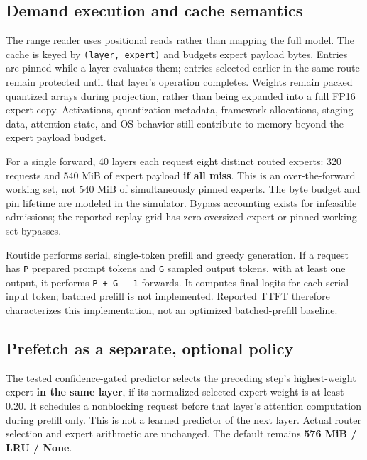 \documentclass[11pt]{article}
\begin{document}
\hypertarget{demand-execution-and-cache-semantics}{%
\subsection{Demand execution and cache semantics}\label{demand-execution-and-cache-semantics}}

The range reader uses positional reads rather than mapping the full model.
The cache is keyed by \texttt{(layer,\ expert)} and budgets expert payload bytes.
Entries are pinned while a layer evaluates them; entries selected earlier in
the same route remain protected until that layer's operation completes.
Weights remain packed quantized arrays during projection, rather than being
expanded into a full FP16 expert copy. Activations, quantization metadata,
framework allocations, staging data, attention state, and OS behavior still
contribute to memory beyond the expert payload budget.

For a single forward, 40 layers each request eight distinct routed experts:
320 requests and 540 MiB of expert payload \textbf{if all miss}. This is an
over-the-forward working set, not 540 MiB of simultaneously pinned experts.
The byte budget and pin lifetime are modeled in the simulator. Bypass
accounting exists for infeasible admissions; the reported replay grid has
zero oversized-expert or pinned-working-set bypasses.

Routide performs serial, single-token prefill and greedy generation. If a
request has \texttt{P} prepared prompt tokens and \texttt{G} sampled output tokens, with
at least one output, it performs \texttt{P\ +\ G\ -\ 1} forwards. It computes final
logits for each serial input token; batched prefill is not implemented.
Reported TTFT therefore characterizes this implementation, not an optimized
batched-prefill baseline.

\hypertarget{prefetch-as-a-separate-optional-policy}{%
\subsection{Prefetch as a separate, optional policy}\label{prefetch-as-a-separate-optional-policy}}

The tested confidence-gated predictor selects the preceding step's
highest-weight expert \textbf{in the same layer}, if its normalized selected-expert
weight is at least 0.20. It schedules a nonblocking request before that layer's
attention computation during prefill only. This is not a learned predictor
of the next layer. Actual router selection and expert arithmetic are unchanged.
The default remains \textbf{576 MiB / LRU / None}.
\end{document}

